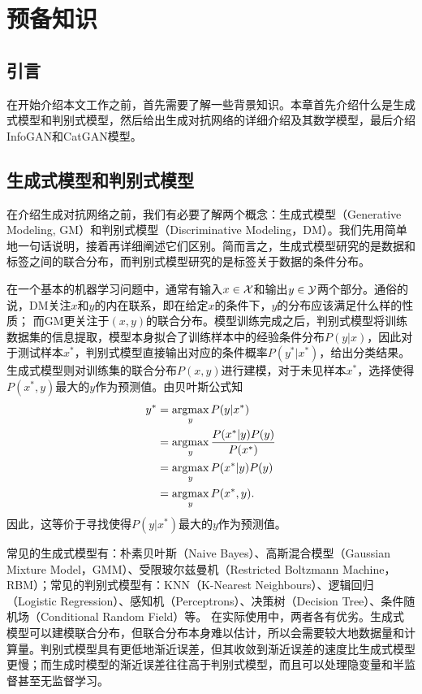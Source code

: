 \chapter{预备知识}\label{chap:preliminaries}
\section{引言}
在开始介绍本文工作之前，首先需要了解一些背景知识。本章首先介绍什么是生成式模型和判别式模型，然后给出生成对抗网络的详细介绍及其数学模型，最后介绍InfoGAN和CatGAN模型。

\section{生成式模型和判别式模型}\label{sec:gm-dm}
在介绍生成对抗网络之前，我们有必要了解两个概念：生成式模型（Generative Modeling, GM）和判别式模型（Discriminative Modeling，DM）。我们先用简单地一句话说明，接着再详细阐述它们区别。简而言之，生成式模型研究的是数据和标签之间的联合分布，而判别式模型研究的是标签关于数据的条件分布。

在一个基本的机器学习问题中，通常有输入$x \in \mathcal{X}$和输出$y \in \mathcal{Y}$两个部分。通俗的说，DM关注$x$和$y$的内在联系，即在给定$x$的条件下，$y$的分布应该满足什么样的性质；
而GM更关注于$(x, y)$的联合分布。模型训练完成之后，判别式模型将训练数据集的信息提取，模型本身拟合了训练样本中的经验条件分布$P(y|x)$，因此对于测试样本$x^*$，判别式模型直接输出对应的条件概率$P(y^* | x^*)$，给出分类结果。生成式模型则对训练集的联合分布$P(x,y)$进行建模，对于未见样本$x^*$，选择使得$P(x^*, y)$最大的$y$作为预测值。由贝叶斯公式知
\[
  \begin{split}
    y^{*} &= \mathop{\text{argmax}}_y P(y|x^{*}) \\
       &= \mathop{\text{argmax}}_y \frac{P(x^*|y)P(y)}{P(x^*)} \\
       &= \mathop{\text{argmax}}_y P(x^*|y)P(y) \\
       &= \mathop{\text{argmax}}_y P(x^*, y).
  \end{split}
\]
因此，这等价于寻找使得$P(y|x^*)$最大的$y$作为预测值。

常见的生成式模型有：朴素贝叶斯（Naive Bayes）、高斯混合模型（Gaussian Mixture Model，GMM）、受限玻尔兹曼机（Restricted Boltzmann Machine，RBM）；常见的判别式模型有：KNN（K-Nearest Neighbours）、逻辑回归（Logistic Regression）、感知机（Perceptrons）、决策树（Decision Tree）、条件随机场（Conditional Random Field）等。
在实际使用中，两者各有优劣。生成式模型可以建模联合分布，但联合分布本身难以估计，所以会需要较大地数据量和计算量。判别式模型具有更低地渐近误差，但其收敛到渐近误差的速度比生成式模型更慢；而生成时模型的渐近误差往往高于判别式模型\citep{ng2002discriminative}，而且可以处理隐变量和半监督甚至无监督学习。



